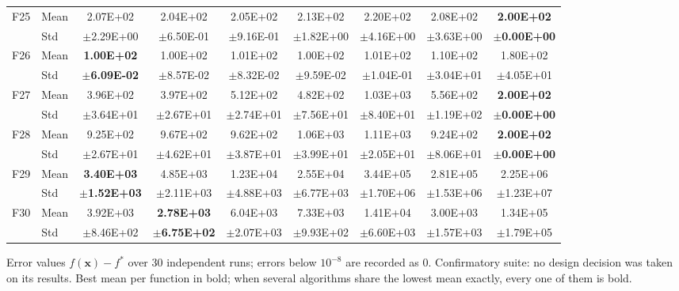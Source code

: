 \begin{table}[htbp]
{\begin{tabular}{clccccccc}
F25 & Mean & 2.07E+02 & 2.04E+02 & 2.05E+02 & 2.13E+02 & 2.20E+02 & 2.08E+02 & \textbf{2.00E+02} \\
 & Std & $\pm$2.29E+00 & $\pm$6.50E-01 & $\pm$9.16E-01 & $\pm$1.82E+00 & $\pm$4.16E+00 & $\pm$3.63E+00 & $\pm$\textbf{0.00E+00} \\
F26 & Mean & \textbf{1.00E+02} & 1.00E+02 & 1.01E+02 & 1.00E+02 & 1.01E+02 & 1.10E+02 & 1.80E+02 \\
 & Std & $\pm$\textbf{6.09E-02} & $\pm$8.57E-02 & $\pm$8.32E-02 & $\pm$9.59E-02 & $\pm$1.04E-01 & $\pm$3.04E+01 & $\pm$4.05E+01 \\
F27 & Mean & 3.96E+02 & 3.97E+02 & 5.12E+02 & 4.82E+02 & 1.03E+03 & 5.56E+02 & \textbf{2.00E+02} \\
 & Std & $\pm$3.64E+01 & $\pm$2.67E+01 & $\pm$2.74E+01 & $\pm$7.56E+01 & $\pm$8.40E+01 & $\pm$1.19E+02 & $\pm$\textbf{0.00E+00} \\
F28 & Mean & 9.25E+02 & 9.67E+02 & 9.62E+02 & 1.06E+03 & 1.11E+03 & 9.24E+02 & \textbf{2.00E+02} \\
 & Std & $\pm$2.67E+01 & $\pm$4.62E+01 & $\pm$3.87E+01 & $\pm$3.99E+01 & $\pm$2.05E+01 & $\pm$8.06E+01 & $\pm$\textbf{0.00E+00} \\
F29 & Mean & \textbf{3.40E+03} & 4.85E+03 & 1.23E+04 & 2.55E+04 & 3.44E+05 & 2.81E+05 & 2.25E+06 \\
 & Std & $\pm$\textbf{1.52E+03} & $\pm$2.11E+03 & $\pm$4.88E+03 & $\pm$6.77E+03 & $\pm$1.70E+06 & $\pm$1.53E+06 & $\pm$1.23E+07 \\
F30 & Mean & 3.92E+03 & \textbf{2.78E+03} & 6.04E+03 & 7.33E+03 & 1.41E+04 & 3.00E+03 & 1.34E+05 \\
 & Std & $\pm$8.46E+02 & $\pm$\textbf{6.75E+02} & $\pm$2.07E+03 & $\pm$9.93E+02 & $\pm$6.60E+03 & $\pm$1.57E+03 & $\pm$1.79E+05 \\
\bottomrule
\end{tabular}}
\begin{flushleft}\footnotesize
Error values $f(\mathbf{x})-f^{*}$ over 30 independent runs; errors below $10^{-8}$ are recorded as 0. Confirmatory suite: no design decision was taken on its results. Best mean per function in bold; when several algorithms share the lowest mean exactly, every one of them is bold.
\end{flushleft}
\end{table}
